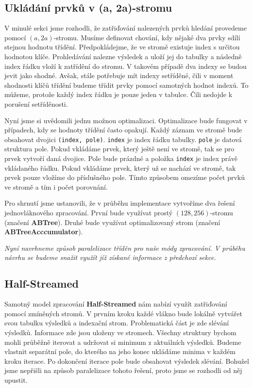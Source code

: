 \subsection{Ukládání prvků v (a, 2a)-stromu}

V minulé sekci jsme rozhodli, že zatřiďování nalezených prvků hledání provedeme pomocí $(a, 2a)$-stromu.
Musíme definovat chování, kdy nějaké dva prvky sdílí stejnou hodnotu třídění.
Předpokládejme, že ve stromě existuje index s určitou hodnotou klíče.
Prohledávání nalezne výsledek a uloží jej do tabulky a následně index řádku vloží k zatřídění do stromu.
V takovém případě dva indexy se budou jevit jako shodné.
Avšak, stále potřebuje mít indexy setříděné, čili v moment shodnosti klíčů třídění budeme třídit prvky pomocí samotných hodnot indexů.
To můžeme, protože každý index řádku je pouze jeden v tabulce.
Čili nedojde k porušení setříděnosti.

Nyní jsme si uvědomili jednu možnou optimalizaci.
Optimalizace bude fungovat v případech, kdy se hodnoty třídění často opakují.
Každý záznam ve stromě bude obsahovat dvojici \texttt{(index, pole)}.
\texttt{index} je index řádku tabulky.
\texttt{pole} je datová struktura pole.
Pokud vkládáme prvek, který ještě není ve stromě, tak se pro prvek vytvoří daná dvojice.
Pole bude prázdné a položka \texttt{index} je index právě vkládaného řádku.
Pokud vkládáme prvek, který už se nachází ve stromě, tak prvek pouze vložíme do příslušného pole.
Tímto způsobem omezíme počet prvků ve stromě a tím i počet porovnání.

Pro shrnutí jsme ustanovili, že v průběhu implementace vytvoříme dva řešení jednovláknového zpracování.
První bude využívat prostý $(128, 256)$-stromu (značení \textbf{ABTree}).
Druhé bude využívat optimalizovaný strom (značení \textbf{ABTreeAcccumulator}).

\bigskip
\textit{Nyní navrhneme způsob paralelizace tříděn pro naše módy zpracování.
V průběhu návrhu se budeme snažit využít jíž získané informace z předchozí sekce.}

\subsection{Half-Streamed}

Samotný model zpracování \textbf{Half-Streamed} nám nabízí využít zatřiďování pomocí zmíněných stromů.
V prvním kroku každé vlákno bude lokálně vytvářet svou tabulku výsledků a indexační strom.
Problematická část je zde slévání výsledků.
Informace zde jsou uloženy ve stromech.
Všechny struktury bychom mohli průběžně iterovat a udržovat si minimum z aktuálních výsledků.
Budeme vlastnit separátní pole, do kterého na jeho konec ukládáme minima v každém kroku iterace.
Po dokončení iterace pole bude obsahovat výsledek slévání.
Bohužel jsme nepřišli na způsob paralelizace tohoto řešení, proto jsme se rozhodli od něj upustit.

